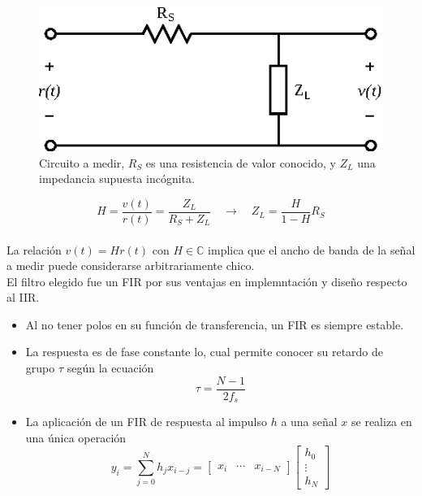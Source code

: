 \documentclass[11pt,a4paper]{extarticle}
\begin{document}
\begin{multicols}{2}
\begin{figure}[H]
	\centering
	\includegraphics[width=0.7\linewidth]{Images/transferencia.eps}
	\caption{Circuito a medir, $R_S$ es una resistencia de valor conocido, y $Z_L$ una impedancia supuesta incógnita.}
	\label{fig:transferencia}
\end{figure}

\begin{equation}\label{eq:impedancia}
	H = \frac{v(t)}{r(t)} = \frac{Z_L}{R_S + Z_L} \quad \longrightarrow \quad Z_L =  \frac{H}{1-H}R_S	
\end{equation}\\[-1em]

La relación $v(t) = H r(t)$ con $H \in \mathbb C$ implica que el ancho de banda de la señal a medir puede considerarse arbitrariamente chico.\\

El filtro elegido fue un FIR por sus ventajas en implemntación y diseño respecto al IIR.\cite{haykin_8}
\begin{itemize}
	\item Al no tener polos en su función de transferencia, un FIR es siempre estable.
	\item La respuesta es de fase constante lo, cual permite conocer su retardo de grupo $\tau$ según la ecuación
	\begin{equation}\label{eq:tau}
		\tau = \frac{N-1}{2f_s}
	\end{equation}
	\item La aplicación de un FIR de respuesta al impulso $h$ a una señal $x$ se realiza en una única operación
	\begin{equation*}\label{eq:fir}
		y_i = \sum_{j=0}^N h_jx_{i-j}= 
		\begin{bmatrix}
			x_i & \cdots & x_{i-N}
		\end{bmatrix}
		\begin{bmatrix}
			h_0 \\ \vdots \\ h_N	
		\end{bmatrix}
	\end{equation*}
\end{itemize} 



\end{multicols}
\end{document}
